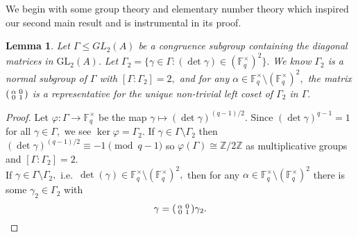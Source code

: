 \documentclass[11pt]{amsart}
\newtheorem{lemma}[theorem]{Lemma}
\newtheorem{corollary}[theorem]{Corollary}
\theoremstyle{definition}
\newenvironment{psmallmatrix}
{\left(\begin{smallmatrix}}
	{\end{smallmatrix}\right)}
\numberwithin{equation}{section}
\newcommand{\GL}{\mathrm{GL}} 	%
\newcommand{\bbF}{\mathbb{F}}		%
\newcommand{\bbZ}{\mathbb{Z}}		%
\begin{document}
		We begin with some group theory and elementary number theory which inspired our second main result and is instrumental in its proof.
		\begin{lemma}\label{l: Gamma2 normal, index 2, coset rep}
			Let $\Gamma \leq GL_2(A)$ be a congruence subgroup containing the diagonal matrices in $\GL_2(A).$ Let $\Gamma_2=\{\gamma\in \Gamma: (\det \gamma)\in (\bbF_q^{\times})^2 \}.$ We know $\Gamma_2$ is a normal subgroup of $\Gamma$ with $[\Gamma:\Gamma_2]=2,$ and for any $\alpha\in \bbF_q^{\times}\setminus(\bbF_q^{\times})^2,$ the matrix $\begin{psmallmatrix}\alpha&0\\0&1\end{psmallmatrix}$ is a representative for the unique non-trivial left coset of $\Gamma_2$ in $\Gamma.$
		\end{lemma}
		\begin{proof}
			Let $\varphi:\Gamma\to \bbF_q^{\times}$ be the map $\gamma\mapsto (\det\gamma)^{(q-1)/2}.$ Since $(\det\gamma)^{q-1}=1$ for all $\gamma\in \Gamma,$ we see $\ker\varphi=\Gamma_2.$ If $\gamma\in \Gamma\setminus\Gamma_2$ then $(\det\gamma)^{(q-1)/2}\equiv -1\pmod{q-1}$ so $\varphi(\Gamma)\cong \bbZ/2\bbZ$ as multiplicative groups and $[\Gamma:\Gamma_2]=2.$\\
			
			If $\gamma\in \Gamma\setminus \Gamma_2,$ i.e.\ $\det(\gamma)\in \bbF_q^{\times}\setminus(\bbF_q^{\times})^2,$ then for any $\alpha\in \bbF_q^{\times}\setminus(\bbF_q^{\times})^2$ there is some $\gamma_2\in \Gamma_2$ with 
			\[\gamma=\begin{psmallmatrix}\alpha&0\\0&1\end{psmallmatrix}\gamma_2.\]
		\end{proof}
		
		
\end{document}

